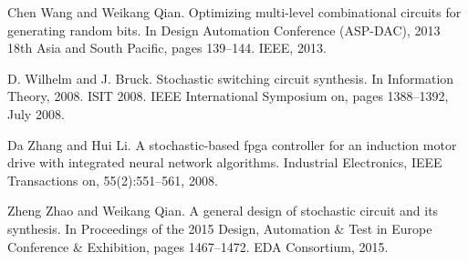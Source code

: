 \documentclass[10pt,conference]{IEEEtran}
\begin{document}
\begin{thebibliography}{}
 Chen Wang and Weikang Qian. Optimizing multi-level combinational
circuits for generating random bits. In Design Automation Conference
(ASP-DAC), 2013 18th Asia and South Pacific, pages 139–144. IEEE,
2013.

  D. Wilhelm and J. Bruck. Stochastic switching circuit synthesis. In
Information Theory, 2008. ISIT 2008. IEEE International Symposium
on, pages 1388–1392, July 2008.

  Da Zhang and Hui Li. A stochastic-based fpga controller for an induction
motor drive with integrated neural network algorithms. Industrial
Electronics, IEEE Transactions on, 55(2):551–561, 2008.

 Zheng Zhao and Weikang Qian. A general design of stochastic circuit
and its synthesis. In Proceedings of the 2015 Design, Automation
& Test in Europe Conference & Exhibition, pages 1467–1472. EDA
Consortium, 2015.

\end{thebibliography}




\end{document}
